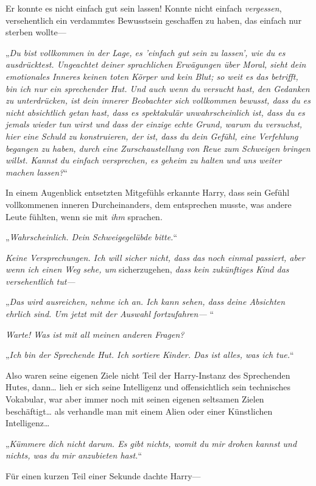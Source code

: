 {Er konnte es nicht einfach gut sein lassen! Konnte nicht einfach \emph{vergessen}, versehentlich ein verdammtes Bewusstsein geschaffen zu haben, das einfach nur sterben wollte—

„\emph{Du bist vollkommen in der Lage, es 'einfach gut sein zu lassen', wie du es ausdrücktest. Ungeachtet deiner sprachlichen Erwägungen über Moral, sieht dein emotionales Inneres keinen toten Körper und kein Blut; so weit es das betrifft, bin ich nur ein sprechender Hut. Und auch wenn du versucht hast, den Gedanken zu unterdrücken, ist dein innerer Beobachter sich vollkommen bewusst, dass du es nicht absichtlich getan hast, dass es spektakulär unwahrscheinlich ist, dass du es jemals wieder tun wirst und dass der einzige echte Grund, warum du versuchst, hier eine Schuld zu konstruieren, der ist, dass du dein Gefühl, eine Verfehlung begangen zu haben, durch eine Zurschaustellung von Reue zum Schweigen bringen willst. Kannst du einfach versprechen, es geheim zu halten und uns weiter machen lassen?}“

In einem Augenblick entsetzten Mitgefühls erkannte Harry, dass sein Gefühl vollkommenen inneren Durcheinanders, dem entsprechen musste, was andere Leute fühlten, wenn sie mit \emph{ihm} sprachen.

„\emph{Wahrscheinlich. Dein Schweigegelübde bitte.}“

\emph{Keine Versprechungen. Ich will sicher nicht, dass das noch einmal passiert, aber wenn ich einen Weg sehe, um} sicherzugehen, \emph{dass kein zukünftiges Kind das versehentlich tut—}

„\emph{Das wird ausreichen, nehme ich an. Ich kann sehen, dass deine Absichten ehrlich sind. Um jetzt mit der Auswahl fortzufahren—} “

\emph{Warte! Was ist mit all meinen anderen Fragen?}

„\emph{Ich bin der Sprechende Hut. Ich sortiere Kinder. Das ist alles, was ich tue.}“

Also waren seine eigenen Ziele nicht Teil der Harry-Instanz des Sprechenden Hutes, dann… lieh er sich seine Intelligenz und offensichtlich sein technisches Vokabular, war aber immer noch mit seinen eigenen seltsamen Zielen beschäftigt… als verhandle man mit einem Alien oder einer Künstlichen Intelligenz…

„\emph{Kümmere dich nicht darum. Es gibt nichts, womit du mir drohen kannst und nichts, was du mir anzubieten hast.}“

Für einen kurzen Teil einer Sekunde dachte Harry—

}
